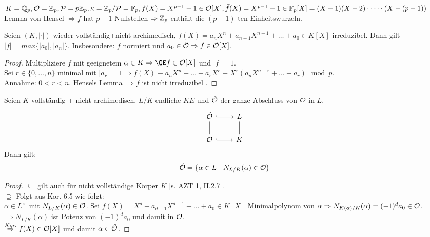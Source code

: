 \begin{Bsp}
$K=\mathbb{Q}_p, \mathcal{O}=\mathbb{Z}_p, \mathcal{P}=p\mathbb{Z}_p, \kappa = \mathbb{Z}_p/\mathcal{P}=\mathbb{F}_p, f(X)=X^{p-1}-1 \in \mathcal{O}[X], \bar{f}(X)=X^{p-1} -1 \in \mathbb{F}_p[X]=(X-1)(X-2)\cdot \dots \cdot (X-(p-1))$\\
Lemma von Hensel $\Rightarrow f$ hat $p-1$ Nullstellen $\Rightarrow \mathbb{Z}_p$ enthält die $(p-1)$-ten Einheitswurzeln.
\end{Bsp}

\begin{Kor}
Seien $(K, |\cdot|)$ wieder vollständig+nicht-archimedisch, $f(X)=a_nX^n+a_{n-1}X^{n-1} + \dots + a_0 \in K[X]$ irreduzibel. Dann gilt $|f|=max\{|a_0|, |a_n|\}$. Insbesondere: $f$ normiert und $a_0 \in \mathcal{O} \Rightarrow f \in \mathcal{O}[X]$.
\end{Kor}

\begin{proof}
Multipliziere $f$ mit geeignetem $\alpha \in K \Rightarrow \OE f \in \O[X]$ und $|f|=1$.\\
Sei $r \in \{0, \dots, n\}$ minimal mit $|a_r|=1 \Rightarrow f(X)\equiv a_nX^n+\dots+a_rX^r \equiv X^r(a_nX^{n-r}+ \dots +a_r) \mod p$.\\
Annahme: $0 < r< n$. Hensels Lemma $\Rightarrow f$ ist nicht irreduzibel \Lightning.
\end{proof}

\begin{Lem}
Seien $K$ vollständig + nicht-archimedisch, $L/K$ endliche $KE$ und $\hat{\mathcal{O}}$ der ganze Abschluss von $\mathcal{O}$ in $L$.
\[\begin{tikzcd}
\hO \arrow[r, hookrightarrow] & L\\
\O \arrow[u, dash] \arrow[r, hookrightarrow] & K \arrow[u, dash]
\end{tikzcd}\]
Dann gilt:
\[\hat{\mathcal{O}}=\{\alpha \in L \ | \ N_{L/K}(\alpha) \in \mathcal{O}\}\]
\end{Lem}

\begin{proof}
\glqq $\subseteq$ \grqq gilt auch für nicht vollständige Körper $K$ [s. AZT 1, II.2.7].\\
\glqq $\supseteq$ \grqq Folgt aus Kor. 6.5 wie folgt:\\
$\alpha \in L^\times$ mit $N_{L/K}(\alpha) \in \mathcal{O}$. Sei $f(X)=X^d+a_{d-1} X^{d-1}+\dots+a_0 \in K[X]$ Minimalpolynom von $\alpha \Rightarrow N_{K(\alpha)/K}(\alpha)=(-1)^da_0 \in \mathcal{O}$.\\
$\Rightarrow N_{L/K}(\alpha)$ ist Potenz von $(-1)^d a_0$ und damit in $\mathcal{O}$.\\
$\stackrel{Kor.}{\Rightarrow} f(X) \in \mathcal{O}[X]$ und damit $\alpha \in \hat{\mathcal{O}}$.
\end{proof}

